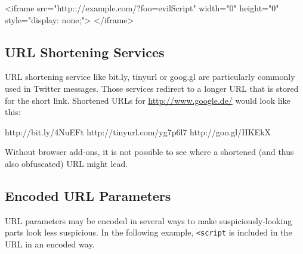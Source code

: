 \begin{htmlcode}
<iframe src="http:://example.com/?foo=evilScript"
  width="0" height="0" style="display: none;">
</iframe>
\end{htmlcode}

\subsection{URL Shortening Services}
URL shortening service like bit.ly, tinyurl or goog.gl are particularly commonly used in Twitter messages. Those services redirect to a longer URL that is stored for the short link. Shortened URLs for \url{http://www.google.de/} would look like this:

\begin{textcode}
 http://bit.ly/4NuEFt
 http://tinyurl.com/yg7p6l7
 http://goo.gl/HKEkX
\end{textcode}

Without browser add-ons, it is not possible to see where a shortened (and thus also obfuscated) URL might lead.

\subsection{Encoded URL Parameters}
URL parameters may be encoded in several ways to make suspiciously-looking parts look less suspicious. In the following example, \texttt{<script} is included in the URL in an encoded way.

